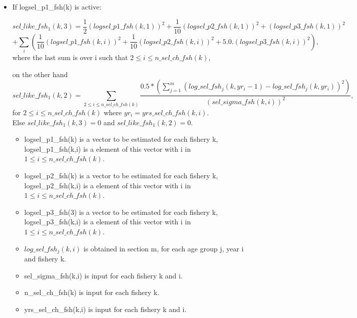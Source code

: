 \documentclass{article}
\begin{document}
\begin{itemize}
    \item If logsel\_p1\_fsh(k) is active: 


\begin{equation}
sel\_like\_fsh_1(k,3)= \dfrac{1}{2}(logsel\_p1\_fsh(k,1))^2+\dfrac{1}{10}(logsel\_p2\_fsh(k,1))^2+(logsel\_p3\_fsh(k,1))^2
\end{equation}
\begin{equation*}
    +\sum_{i}\left(\dfrac{1}{10}( logsel\_p1\_fsh(k,i))^2+\dfrac{1}{10}(logsel\_p2\_fsh(k,i))^2+ 5.0.(logsel\_p3\_fsh(k,i))^2\right),
\end{equation*}
where the last sum is over i such that $2 \leq i \leq n\_sel\_ch\_fsh(k)$,

on the other hand
\begin{equation}
    sel\_like\_fsh_1(k,2)=\sum_{2\leq i \leq n\_sel\_ch\_fsh(k)}\dfrac{0.5*\displaystyle\left(\sum_{j=1}^m(log\_sel\_fsh_j(k,yr_i-1)-log\_sel\_fsh_j(k,yr_i))^2\right)}{(sel\_sigma\_fsh(k,i))^2},
\end{equation}
for $2 \leq i \leq n\_sel\_ch\_fsh(k)$ 
where  $yr_i=yrs\_sel\_ch\_fsh(k,i)$.\\
Else $sel\_like\_fsh_1(k,3)=0$ and $sel\_like\_fsh_1(k,2)=0$.
\begin{itemize}
    \item logsel\_p1\_fsh(k) is  a vector to be estimated for each fishery k, logsel\_p1\_fsh(k,i) is a element of this vector with i in $1\leq i \leq n\_sel\_ch\_fsh(k)$.
    \item logsel\_p2\_fsh(k) is  a vector to be estimated for each fishery k, logsel\_p2\_fsh(k,i) is a element of this vector with i in $1\leq i \leq n\_sel\_ch\_fsh(k)$. 
    \item logsel\_p3\_fsh(3) is  a vector to be estimated for each fishery k, logsel\_p3\_fsh(k,i) is a element of this vector with i in $1\leq i \leq n\_sel\_ch\_fsh(k)$.
    \item $log\_sel\_fsh_j(k,i)$ is obtained in section m, for each age group j, year i and fishery k.
    \item sel\_sigma\_fsh(k,i) is input for each fishery k and i.
    \item n\_sel\_ch\_fsh(k) is input for each fishery k.
    \item yrs\_sel\_ch\_fsh(k,i) is input for each fishery k and i.
\end{itemize}




\end{itemize}
\end{document}
